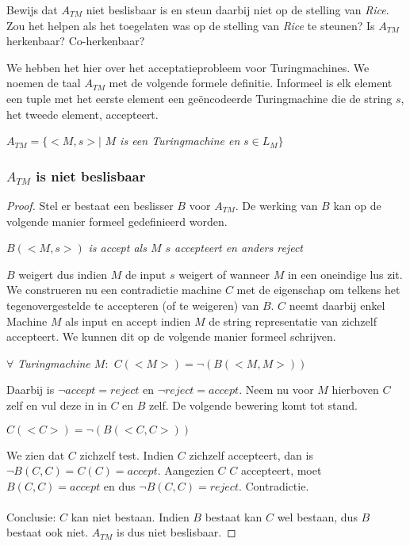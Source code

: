 \begin{quest}
	Bewijs dat $A_{TM}$ niet beslisbaar is en steun daarbij niet op de stelling van \textit{Rice}. Zou het helpen als het toegelaten was op de stelling van \textit{Rice} te steunen? Is $A_{TM}$ herkenbaar? Co-herkenbaar?
\end{quest}

We hebben het hier over het acceptatieprobleem voor Turingmachines. We noemen de taal $A_{TM}$ met de volgende formele definitie. Informeel is elk element een tuple met het eerste element een ge\"encodeerde Turingmachine die de string $s$, het tweede element, accepteert.
\begin{center}
	$A_{TM} = \{ <M,s> |$ \textit{$M$ is een Turingmachine en} $ s \in L_M\}$
\end{center}

\subsubsection*{$A_{TM}$ is niet beslisbaar}
\begin{proof}
	Stel er bestaat een beslisser $B$ voor $A_{TM}$. De werking van $B$ kan op de volgende manier formeel gedefinieerd worden.

	\begin{pushcenter}
		$B(<M,s>)$ \textit{is accept als $M$ $s$ accepteert en anders reject}
	\end{pushcenter}

	$B$ weigert dus indien $M$ de input $s$ weigert of wanneer $M$ in een oneindige lus zit.
	We construeren nu een contradictie machine $C$ met de eigenschap om telkens het tegenovergestelde te accepteren (of te weigeren) van $B$. $C$ neemt daarbij enkel Machine $M$ als input en accept indien $M$ de string representatie van zichzelf accepteert. We kunnen dit op de volgende manier formeel schrijven.

	\begin{pushcenter}
		$\forall$ \textit{Turingmachine $M:$ $C(<M>) = \neg (B(<M,M>))$}
	\end{pushcenter}

	Daarbij is $\neg accept = reject$ en $\neg reject = accept$.  Neem nu voor $M$ hierboven $C$ zelf en vul deze in in $C$ en $B$ zelf. De volgende bewering komt tot stand.

	\begin{pushcenter}
		$C(<C>) = \neg (B(<C,C>))$
	\end{pushcenter}

	We zien dat $C$ zichzelf test. Indien $C$ zichzelf accepteert, dan is $\neg B(C,C) = C(C) = accept$. Aangezien $C$ $C$ accepteert, moet $B(C,C) = accept$ en dus $\neg B(C,C) = reject$. Contradictie.
	\\\\
	Conclusie: $C$ kan niet bestaan. Indien $B$ bestaat kan $C$ wel bestaan, dus $B$ bestaat ook niet. $A_{TM}$ is dus niet beslisbaar.
\end{proof}

